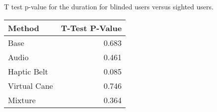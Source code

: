 
\centering
\caption{T test p-value for the duration for blinded users versus sighted users.}
\label{tab:ttest_duration}
\begin{tabular}{lr}
\toprule
      Method &  T-Test P-Value \\
\midrule
        Base &           0.683 \\
       Audio &           0.461 \\
 Haptic Belt &           0.085 \\
Virtual Cane &           0.746 \\
     Mixture &           0.364 \\
\bottomrule
\end{tabular}
